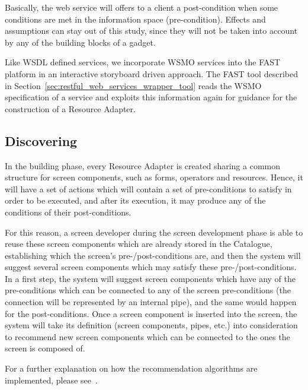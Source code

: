 \documentclass{fast_latex}
\begin{document}
Basically, the web service will offers to a client a post-condition when some conditions are met in the information space (pre-condition). Effects and assumptions can stay out of this study, since they will not be taken into account by any of the building blocks of a gadget.

Like WSDL defined services, we incorporate WSMO services into the FAST platform in an interactive storyboard driven approach. The FAST tool described in Section~\ref{sec:restful_web_services_wrapper_tool} reads the WSMO specification of a service and exploits this information again for guidance for the construction of a Resource Adapter. 


\subsection{Discovering} %
\label{sub:discovering}

In the building phase, every Resource Adapter is created sharing a common structure for screen components, such as forms, operators and resources. Hence, it will have a set of actions which will contain a set of pre-conditions to satisfy in order to be executed, and after its execution, it may produce any of the conditions of their post-conditions.

For this reason, a screen developer during the screen development phase is able to reuse these screen components which are already stored in the Catalogue, establishing which the screen's pre-/post-conditions are, and then the system will suggest several screen components which may satisfy these pre-/post-conditions. In a first step, the system will suggest screen components which have any of the pre-conditions which can be connected to any of the screen pre-conditions (the connection will be represented by an internal pipe), and the same would happen for the post-conditions. Once a screen component is inserted into the screen, the system will take its definition (screen components, pipes, etc.) into consideration to recommend new screen components which can be connected to the ones the screen is composed of.

For a further explanation on how the recommendation algorithms are implemented, please see~\cite{rivera2011catalogue_user_manual}.


\end{document}
